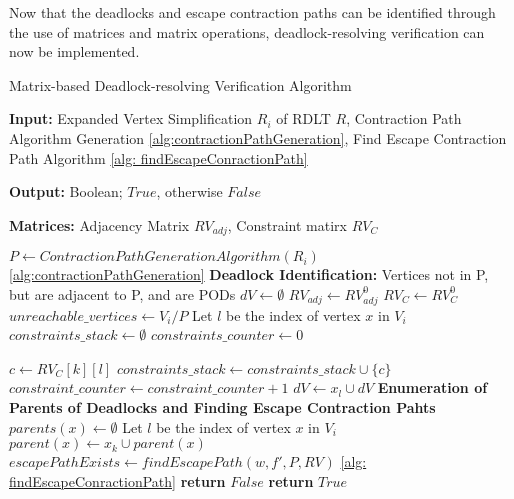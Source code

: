 Now that the deadlocks and escape contraction paths can be identified through the use of matrices and matrix operations, deadlock-resolving verification can now be implemented. 

\begin{algorithm}[H]
    \caption{Matrix-based Deadlock-resolving Verification Algorithm}

    \textbf{Input:} Expanded Vertex Simplification $R_i$ of RDLT $R$, Contraction Path Algorithm Generation \ref{alg:contractionPathGeneration}, Find Escape Contraction Path Algorithm \ref{alg: findEscapeConractionPath}

    \textbf{Output:} Boolean; $True$, otherwise $False$

    \textbf{Matrices:} Adjacency Matrix $RV_{adj}$, Constraint matirx $RV_C$

    \begin{algorithmic}[1]
        \State $P \gets Contraction Path Generation Algorithm (R_i)$ \ref{alg:contractionPathGeneration}
        \Statex \textbf{Deadlock Identification:} Vertices not in P, but are adjacent to P, and are PODs
        \State $dV \gets \emptyset$ 
        \State $RV_{adj} \gets RV^0_{adj}$
        \State $RV_{C} \gets RV^0_{C}$
        \State $unreachable\_vertices \gets V_i / P$ 
            \State Let $l$ be the index of vertex $x$ in $V_i$
            \State $constraints\_stack \gets \emptyset$
            \State $constraints\_counter\gets 0$

                \State $c \gets RV_C[k][l]$
                    \State $constraints\_stack \gets constraints\_stack \cup \{c\}$
                    \State $constraint\_counter \gets constraint\_counter + 1$
                \EndIf
            \EndFor
                \State $dV \gets x_l \cup dV$
            \EndIf
        \EndFor
        \Statex \textbf{Enumeration of Parents of Deadlocks and Finding Escape Contraction Pahts}
            \State $parents(x) \gets \emptyset$
            \State Let $l$ be the index of vertex $x$ in $V_i$
                 
                    \State $parent(x) \gets x_k \cup parent(x)$
                \EndIf
            \EndFor
                \State $escapePathExists \gets findEscapePath(w, f', P, RV_{})$ \ref{alg: findEscapeConractionPath}
                    \State \textbf{return} $False$
                \EndIf
            \EndFor
        \EndFor
        \State \textbf{return} $True$
    \end{algorithmic}
\end{algorithm}

